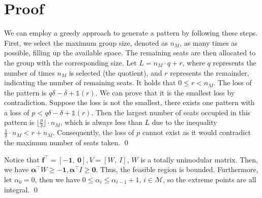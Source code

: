 \clearpage
\section*{Proof}

\begin{pf}[Proof of Lemma \ref{lem_pattern}]
We can employ a greedy approach to generate a pattern by following these steps. First, we select the maximum group size, denoted as $n_M$, as many times as possible, filling up the available space. The remaining seats are then allocated to the group with the corresponding size. Let $L = n_M \cdot q + r$, where $q$ represents the number of times $n_M$ is selected (the quotient), and $r$ represents the remainder, indicating the number of remaining seats. It holds that $0 \leq r < n_M$. The loss of the pattern is $q \delta -\delta + \mathbb{1}(r)$. We can prove that it is the smallest loss by contradiction. 
Suppose the loss is not the smallest, there exists one pattern with a loss of $p < q \delta -\delta + \mathbb{1}(r)$. Then the largest number of seats occupied in this pattern is $\lfloor \frac{p}{\delta} \rfloor \cdot n_M$, which is always less than $L$ due to the inequality $\frac{\mathbb{1}}{\delta} \cdot n_M < r + n_M$. Consequently, the loss of $p$ cannot exist as it would contradict the maximum number of seats taken.
\qed
\end{pf}



\begin{pf}
  Notice that $\mathbf{f}^{\intercal} = [-\mathbf{1},~\mathbf{0}], V =[W,~I]$, $W$ is a totally unimodular matrix. Then, we have $\bm{\alpha}^{\intercal}W \geq -\mathbf{1}, \bm{\alpha}^{\intercal} I \geq \mathbf{0}$. Thus, the feasible region is bounded. 
  Furthermore, let $\alpha_0 = 0$, then we have $0 \leq \alpha_i \leq \alpha_{i-1} +1$, $i \in \mathcal{M}$, so the extreme points are all integral.
  \qed
\end{pf}

